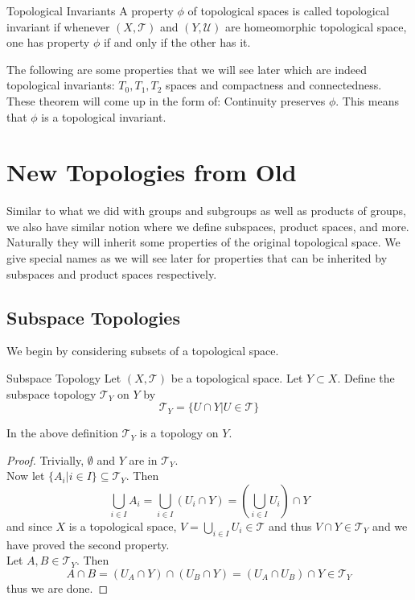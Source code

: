 \documentclass[a4paper]{article}
\begin{document}
\begin{defn}{Topological Invariants}{} A property $\phi$ of topological spaces is called topological invariant if whenever $(X,\mathcal{T})$ and $(Y,\mathcal{U})$ are homeomorphic topological space, one has property $\phi$ if and only if the other has it. 
\end{defn}

The following are some properties that we will see later which are indeed topological invariants: $T_0,T_1,T_2$ spaces and compactness and connectedness. These theorem will come up in the form of: Continuity preserves $\phi$. This means that $\phi$ is a topological invariant. 

\pagebreak
\section{New Topologies from Old}
Similar to what we did with groups and subgroups as well as products of groups, we also have similar notion where we define subspaces, product spaces, and more. Naturally they will inherit some properties of the original topological space. We give special names as we will see later for properties that can be inherited by subspaces and product spaces respectively. 
\subsection{Subspace Topologies}
We begin by considering subsets of a topological space. 
\begin{defn}{Subspace Topology}{} Let $(X,\mathcal{T})$ be a topological space. Let $Y\subset X$. Define the subspace topology $\mathcal{T}_Y$ on $Y$ by $$\mathcal{T}_Y=\{U\cap Y|U\in\mathcal{T}\}$$
\end{defn}

\begin{prp}{}{} In the above definition $\mathcal{T}_Y$ is a topology on $Y$. 
\begin{proof}
Trivially, $\emptyset$ and $Y$ are in $\mathcal{T}_Y$. \\
Now let $\{A_i|i\in I\}\subseteq\mathcal{T}_Y$. Then $$\bigcup_{i\in I}A_i=\bigcup_{i\in I}(U_i\cap Y)=\left(\bigcup_{i\in I}U_i\right)\cap Y$$ and since $X$ is a topological space, $V=\bigcup_{i\in I}U_i\in\mathcal{T}$ and thus $V\cap Y\in\mathcal{T}_Y$ and we have proved the second property. \\
Let $A,B\in\mathcal{T}_Y$. Then $$A\cap B=(U_A\cap Y)\cap(U_B\cap Y)=(U_A\cap U_B)\cap Y\in\mathcal{T}_Y$$ thus we are done. 
\end{proof}
\end{prp}
\end{document}
